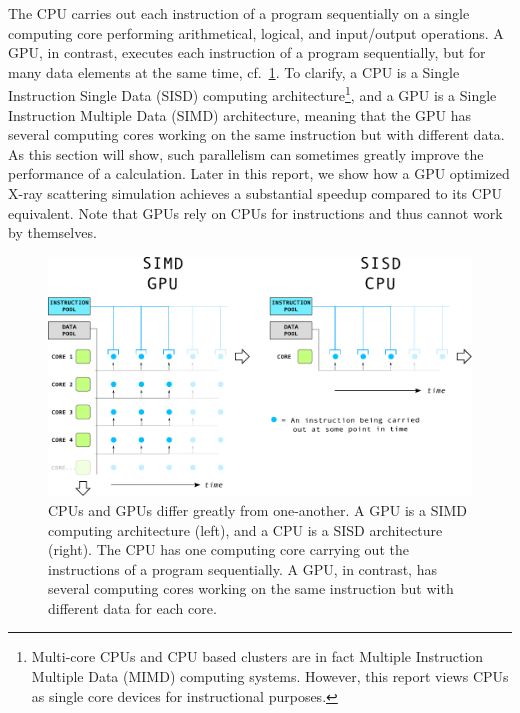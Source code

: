 \documentclass[11pt,twoside]{report}
\begin{document}
\indent The CPU carries out each instruction  of a program sequentially on a single computing core performing arithmetical, logical, and input/output operations. A GPU, in contrast, executes each instruction of a program sequentially, but for many data elements at the same time, cf.~\cref{fig:EXE_PATHS}. To clarify, a CPU is a Single Instruction Single Data (SISD) computing architecture\footnote{Multi-core CPUs and CPU based clusters are in fact Multiple Instruction Multiple Data (MIMD) computing systems. However, this report views CPUs as single core devices for instructional purposes.}, and a GPU is a Single Instruction Multiple Data (SIMD) architecture, meaning that the GPU has several computing cores working on the same instruction but with different data. As this section will show, such parallelism can sometimes greatly improve the performance of a calculation. Later in this report, we show how a GPU optimized X-ray scattering simulation achieves a substantial speedup compared to its CPU equivalent. Note that GPUs rely on CPUs for instructions and thus cannot work by themselves.

\begin{figure}[htbp]
	\begin{center}
  \includegraphics[width=1.0\textwidth]{img/execution_path_newfontv3.pdf}	
	\end{center}
  \caption{CPUs and GPUs differ greatly from one-another. A GPU is a SIMD computing architecture (left), and a CPU is a SISD architecture (right). The CPU has one computing core carrying out the instructions of a program sequentially. A GPU, in contrast, has several computing cores working on the same instruction but with different data for each core.}
	\label{fig:EXE_PATHS}
\end{figure}
\end{document}

